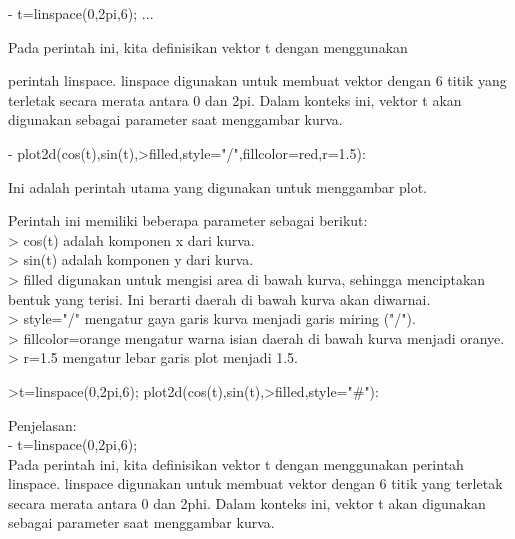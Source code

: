 \documentclass[a4paper,10pt]{article}
\begin{document}
\begin{eulernotebook}
\begin{eulercomment}
\begin{eulercomment}
\begin{eulercomment}
\begin{eulercomment}
\begin{eulercomment}
\begin{eulercomment}
\begin{eulercomment}
\begin{eulercomment}
\begin{eulercomment}
\begin{eulercomment}
\begin{eulercomment}
\begin{eulercomment}
\begin{eulercomment}
- t=linspace(0,2pi,6); ...\\
\end{eulercomment}
\begin{eulerttcomment}
  Pada perintah ini, kita definisikan vektor t dengan menggunakan
\end{eulerttcomment}
\begin{eulercomment}
perintah linspace. linspace digunakan untuk membuat vektor dengan 6
titik yang terletak secara merata antara 0 dan 2pi. Dalam konteks ini,
vektor t akan digunakan sebagai parameter saat menggambar kurva.

- plot2d(cos(t),sin(t),\textgreater{}filled,style="/",fillcolor=red,r=1.5):\\
\end{eulercomment}
\begin{eulerttcomment}
  Ini adalah perintah utama yang digunakan untuk menggambar plot.
\end{eulerttcomment}
\begin{eulercomment}
Perintah ini memiliki beberapa parameter sebagai berikut:\\
\textgreater{} cos(t) adalah komponen x dari kurva.\\
\textgreater{} sin(t) adalah komponen y dari kurva.\\
\textgreater{} filled digunakan untuk mengisi area di bawah kurva, sehingga
menciptakan bentuk yang terisi. Ini berarti daerah di bawah kurva akan
diwarnai.\\
\textgreater{} style="/" mengatur gaya garis kurva menjadi garis miring ("/").\\
\textgreater{} fillcolor=orange mengatur warna isian daerah di bawah kurva menjadi
oranye.\\
\textgreater{} r=1.5 mengatur lebar garis plot menjadi 1.5.

\end{eulercomment}
\begin{eulerprompt}
>t=linspace(0,2pi,6); plot2d(cos(t),sin(t),>filled,style="#"):
\end{eulerprompt}
\begin{eulercomment}
Penjelasan:\\
- t=linspace(0,2pi,6);\\
Pada perintah ini, kita definisikan vektor t dengan menggunakan
perintah linspace. linspace digunakan untuk membuat vektor dengan 6
titik yang terletak secara merata antara 0 dan 2phi. Dalam konteks
ini, vektor t akan digunakan sebagai parameter saat menggambar kurva.


\end{eulercomment}
\end{eulercomment}
\end{eulercomment}
\end{eulercomment}
\end{eulercomment}
\end{eulercomment}
\end{eulercomment}
\end{eulercomment}
\end{eulercomment}
\end{eulercomment}
\end{eulercomment}
\end{eulercomment}
\end{eulercomment}
\end{eulernotebook}
\end{document}
